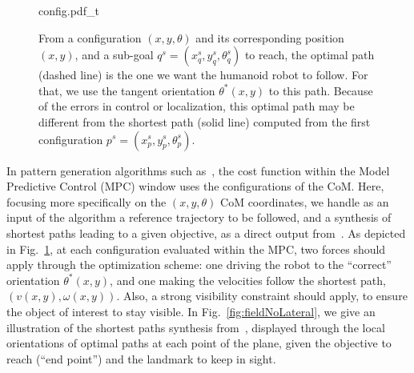 \begin{figure}[h]
\centering
 
                   {config.pdf_t}
\caption{From a configuration $(x,y,\theta)$ and its corresponding position $(x,y)$, and a sub-goal $q^s= (x_q^s,y_q^s,\theta_q^s)$ to reach, the optimal path (dashed line) is the one we want the humanoid robot to follow. For that, we use the tangent orientation $\theta^*(x,y)$ to this path. Because of the errors in control or localization, this optimal path may be different from the shortest path (solid line) computed from the first configuration $p^s= (x_p^s,y_p^s,\theta_p^s)$.
\label{fig:paths}}
\end{figure}

In pattern generation algorithms such as~\cite{HerdtAR2010}, the cost function within the Model Predictive Control (MPC) window uses the configurations of the CoM. Here, focusing more specifically on the $(x,y,\theta)$ CoM coordinates, we handle as an input of the algorithm a reference trajectory to be followed, and a synthesis of shortest paths leading to a given objective, as a direct output from~\cite{Salaris:2010}. As depicted in Fig.~\ref{fig:paths}, at each configuration evaluated within the MPC, two forces should apply through the optimization scheme: one driving the robot to the ``correct'' orientation $\theta^*(x,y)$, and one making the velocities follow the shortest path, $(v(x,y),\omega(x,y))$. Also, a strong visibility constraint should apply, to ensure the object of interest to stay visible. In Fig.~\ref{fig:fieldNoLateral}, we give an illustration of the shortest paths synthesis from~\cite{Salaris:2010}, displayed through the local orientations of optimal paths at each point of the plane, given the objective to reach (``end point'') and the landmark to keep in sight. 





